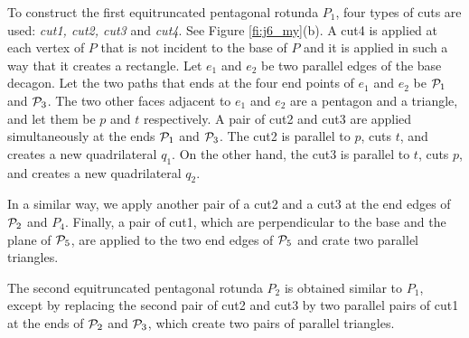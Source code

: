 \documentclass{article}
\begin{document}
To construct the first equitruncated pentagonal rotunda $P_1$,
four types of cuts are used: {\it cut1, cut2, cut3} and {\it cut4}.
See Figure \ref{fi:j6_my}(b).
A cut4 is applied at each vertex of $P$ that is not incident to the base of $P$
and it is applied in such a way that it creates a rectangle.
Let $e_1$ and $e_2$ be two parallel edges of the base decagon.
Let the two paths that ends at the four end points of $e_1$ and $e_2$ be ${\cal P}_1$ and ${\cal P}_3$.
The two other faces adjacent to $e_1$ and $e_2$ are a pentagon and a triangle,
and let them be $p$ and $t$ respectively.
A pair of cut2 and cut3 are applied simultaneously at the ends ${\cal P}_1$ and ${\cal P}_3$.
The cut2 is parallel to $p$, cuts $t$, and creates a new quadrilateral $q_1$.
On the other hand, the cut3 is parallel to $t$, cuts $p$, and creates a new quadrilateral $q_2$.


In a similar way, we apply another pair of a cut2 and a cut3 at the end edges of ${\cal P}_2$ and $P_4$.
Finally, a pair of cut1, which are perpendicular to the base and the plane of ${\cal P}_5$,
are applied to the two end edges of ${\cal P}_5$ and crate two parallel triangles.

The second equitruncated pentagonal rotunda $P_2$ is obtained similar to $P_1$,
except by replacing the second pair of cut2 and cut3 by two parallel pairs of cut1 
at the ends of ${\cal P}_2$ and ${\cal P}_3$, which create two pairs of parallel triangles.
\end{document}
